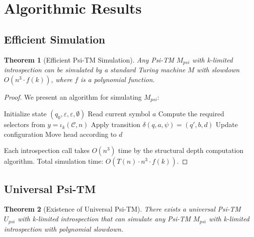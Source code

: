 \documentclass[11pt]{article}
\newtheorem{theorem}{Theorem}
\begin{document}
\section{Algorithmic Results}

\subsection{Efficient Simulation}

\begin{theorem}[Efficient Psi-TM Simulation]
Any Psi-TM $M_{psi}$ with k-limited introspection can be simulated by a standard Turing machine $M$ with slowdown $O(n^3 \cdot f(k))$, where $f$ is a polynomial function.
\end{theorem}

\begin{proof}
We present an algorithm for simulating $M_{psi}$:

\begin{algorithm}
\caption{Psi-TM Simulation}
\begin{algorithmic}
\STATE Initialize state $(q_0, \varepsilon, \varepsilon, \emptyset)$
    \STATE Read current symbol $a$
\STATE Compute the required selectors from $y=\iota_k(\mathcal{C},n)$
    \STATE Apply transition $\delta(q, a, \psi) = (q', b, d)$
    \STATE Update configuration
    \STATE Move head according to $d$
\ENDWHILE
\end{algorithmic}
\end{algorithm}

Each introspection call takes $O(n^3)$ time by the structural depth computation algorithm. Total simulation time: $O(T(n) \cdot n^3 \cdot f(k))$.
\end{proof}

\subsection{Universal Psi-TM}

\begin{theorem}[Existence of Universal Psi-TM]
There exists a universal Psi-TM $U_{psi}$ with k-limited introspection that can simulate any Psi-TM $M_{psi}$ with k-limited introspection with polynomial slowdown.
\end{theorem}
\end{document}
